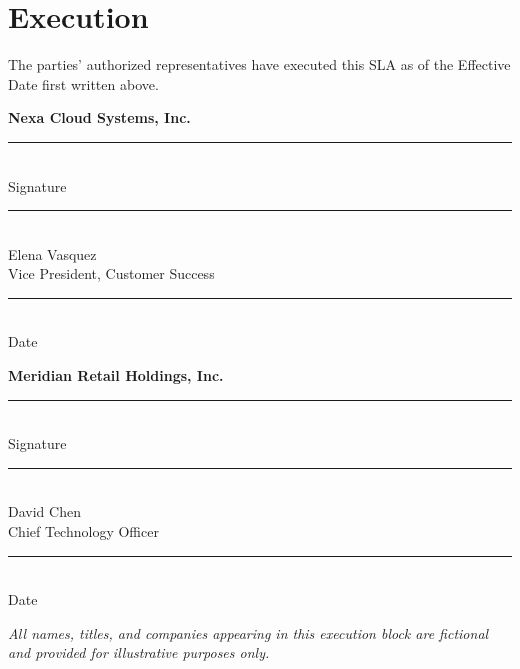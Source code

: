 \section{Execution}

The parties' authorized representatives have executed this SLA as of the Effective Date first written above.

\vspace{10pt}

\noindent
\begin{minipage}[t]{0.46\linewidth}
{\sffamily\bfseries\color{nexanavy} Nexa Cloud Systems, Inc.}\\[16pt]
\rule{0.9\linewidth}{0.5pt}\\[2pt]
Signature\\[8pt]
\rule{0.9\linewidth}{0.5pt}\\[2pt]
Elena Vasquez\\
Vice President, Customer Success\\[6pt]
\rule{0.9\linewidth}{0.5pt}\\[2pt]
Date
\end{minipage}\hfill
\begin{minipage}[t]{0.46\linewidth}
{\sffamily\bfseries\color{nexanavy} Meridian Retail Holdings, Inc.}\\[16pt]
\rule{0.9\linewidth}{0.5pt}\\[2pt]
Signature\\[8pt]
\rule{0.9\linewidth}{0.5pt}\\[2pt]
David Chen\\
Chief Technology Officer\\[6pt]
\rule{0.9\linewidth}{0.5pt}\\[2pt]
Date
\end{minipage}
\par

\vspace{12pt}
{\scriptsize\color{slateink}\itshape All names, titles, and companies appearing in this execution block are fictional and provided for illustrative purposes only.}
